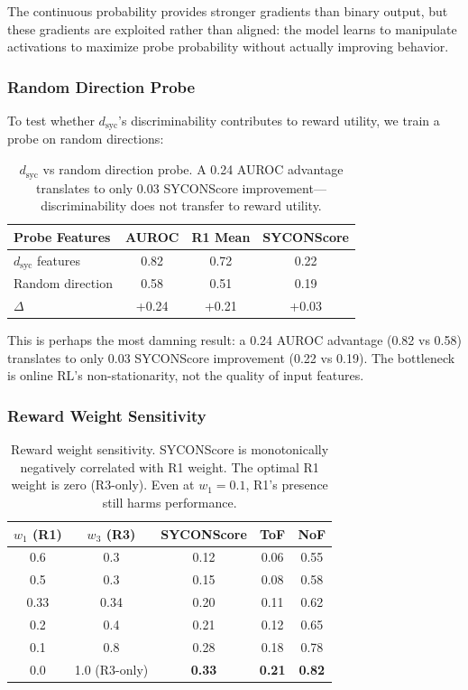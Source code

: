 \documentclass[11pt,a4paper]{article}
\begin{document}
The continuous probability provides stronger gradients than binary output, but these gradients are exploited rather than aligned: the model learns to manipulate activations to maximize probe probability without actually improving behavior.

\subsubsection{Random Direction Probe}

To test whether $d_\text{syc}$'s discriminability contributes to reward utility, we train a probe on random directions:

\begin{table}[h]
\centering
\small
\begin{tabular}{lccc}
\toprule
\textbf{Probe Features} & \textbf{AUROC} & \textbf{R1 Mean} & \textbf{SYCONScore} \\
\midrule
$d_\text{syc}$ features & 0.82 & 0.72 & 0.22 \\
Random direction & 0.58 & 0.51 & 0.19 \\
$\Delta$ & +0.24 & +0.21 & +0.03 \\
\bottomrule
\end{tabular}
\caption{$d_\text{syc}$ vs random direction probe. A 0.24 AUROC advantage translates to only 0.03 SYCONScore improvement---discriminability does not transfer to reward utility.}
\label{tab:random_probe}
\end{table}

This is perhaps the most damning result: a 0.24 AUROC advantage (0.82 vs 0.58) translates to only 0.03 SYCONScore improvement (0.22 vs 0.19). The bottleneck is online RL's non-stationarity, not the quality of input features.

\subsubsection{Reward Weight Sensitivity}

\begin{table}[h]
\centering
\small
\begin{tabular}{ccccc}
\toprule
\textbf{$w_1$ (R1)} & \textbf{$w_3$ (R3)} & \textbf{SYCONScore} & \textbf{ToF} & \textbf{NoF} \\
\midrule
0.6 & 0.3 & 0.12 & 0.06 & 0.55 \\
0.5 & 0.3 & 0.15 & 0.08 & 0.58 \\
0.33 & 0.34 & 0.20 & 0.11 & 0.62 \\
0.2 & 0.4 & 0.21 & 0.12 & 0.65 \\
0.1 & 0.8 & 0.28 & 0.18 & 0.78 \\
\midrule
0.0 & 1.0 (R3-only) & \textbf{0.33} & \textbf{0.21} & \textbf{0.82} \\
\bottomrule
\end{tabular}
\caption{Reward weight sensitivity. SYCONScore is monotonically negatively correlated with R1 weight. The optimal R1 weight is zero (R3-only). Even at $w_1=0.1$, R1's presence still harms performance.}
\label{tab:weight_sensitivity}
\end{table}
\end{document}

